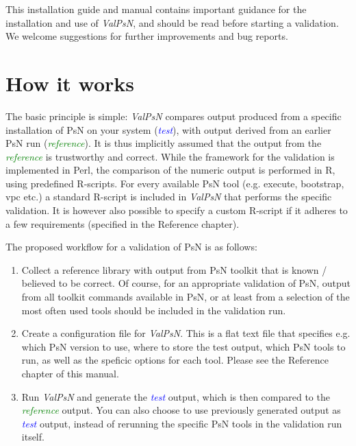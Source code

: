\documentclass[a4,11pt]{report} \usepackage[pdftex]{graphicx}
\newcommand{\test}{\textcolor{Blue}{\textit{test}}\xspace}
\newcommand{\reference}{\textcolor{Green}{\textit{reference}}\xspace}
\newcommand{\ValPsN}{\textcolor{PiranaOrange}{\textit{ValPsN}}\xspace}
\begin{document}
\vspace{10pt}

\noindent This installation guide and manual contains important
guidance for the installation and use of \ValPsN, and should be read
before starting a validation. We
welcome suggestions for further improvements and bug reports.

\vspace{10pt}

\section{How it works}
The basic principle is simple: \ValPsN compares output produced from a
specific installation of PsN on your system (\test), with output
derived from an earlier PsN run (\reference). It is thus implicitly
assumed that the output from the \reference is trustworthy and
correct. While the framework for the validation is implemented in
Perl, the comparison of the numeric output is performed in R, using
predefined R-scripts. For every available PsN tool (e.g. execute,
bootstrap, vpc etc.) a standard R-script is included in \ValPsN that
performs the specific validation. It is however also possible to
specify a custom R-script if it adheres to a few requirements
(specified in the Reference chapter).

\vspace{10pt}

\noindent The proposed workflow for a validation of PsN is as follows:
\begin{enumerate}
\item Collect a reference library with output from PsN toolkit that is
  known / believed to be correct. Of course, for an appropriate
  validation of PsN, output from all toolkit commands available in PsN, or at
  least from a selection of the most often used tools should be included in
  the validation run.
\item Create a configuration file for \ValPsN. This is a flat text file
  that specifies e.g. which PsN version to use, where to store the
  test output, which PsN tools to run, as well as the speficic options for
  each tool. Please see the Reference chapter of this manual.
\item Run \ValPsN and generate the \test output, which is then
  compared to the \reference output. You can also choose to use
  previously generated output as \test output, instead of rerunning
  the specific PsN tools in the validation run itself.
\end{enumerate}
\end{document}
